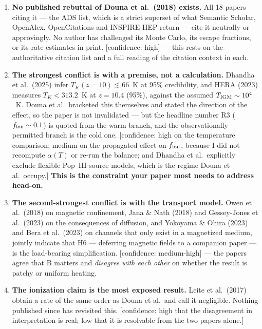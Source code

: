\documentclass[11pt,a4paper]{article}
\newcommand{\flag}[1]{\textcolor{orange!75!black}{\textsf{\small [#1]}}}
\begin{document}
\begin{enumerate}[leftmargin=*,itemsep=4pt]
\item \textbf{No published rebuttal of Douna et al.\ (2018) exists.}
      All 18 papers citing it --- the ADS list, which is a strict superset of
      what Semantic Scholar, OpenAlex, OpenCitations and INSPIRE-HEP return ---
      cite it neutrally or approvingly. No author has challenged its Monte
      Carlo, its escape fractions, or its rate estimates in print.
      \flag{confidence: high} --- this rests on the authoritative citation list
      and a full reading of the citation context in each.

\item \textbf{The strongest conflict is with a premise, not a calculation.}
      Dhandha et al.\ (2025) infer $T_K(z=10)\lesssim66$~K at 95\% credibility,
      and HERA (2023) measures $T_K < 313.2$~K at $z=10.4$ (95\%), against the
      assumed $T_{\rm IGM}\sim10^{4}$~K. Douna et al.\ bracketed this themselves
      and stated the direction of the effect, so the paper is not invalidated
      --- but the headline number R3 ($f_{\rm ion}\sim0.1$) is quoted from the
      warm branch, and the observationally permitted branch is the cold one.
      \flag{confidence: high on the temperature comparison; medium on the
      propagated effect on $f_{\rm ion}$, because I did not recompute
      $\alpha(T)$ or re-run the balance; and Dhandha et al.\ explicitly exclude
      flexible Pop~III source models, which is the regime Douna et al.\ occupy.}
      \textbf{This is the constraint your paper most needs to address head-on.}

\item \textbf{The second-strongest conflict is with the transport model.}
      Owen et al.\ (2018) on magnetic confinement, Jana \& Nath (2018) and
      Gessey-Jones et al.\ (2023) on the consequences of diffusion, and
      Yokoyama \& Ohira (2023) and Bera et al.\ (2023) on channels that only
      exist in a magnetized medium, jointly indicate that H6 --- deferring
      magnetic fields to a companion paper --- is the load-bearing simplification.
      \flag{confidence: medium-high} --- the papers agree that B matters and
      \emph{disagree with each other} on whether the result is patchy or
      uniform heating.

\item \textbf{The ionization claim is the most exposed result.}
      Leite et al.\ (2017) obtain a rate of the same order as Douna et al.\ and
      call it negligible. Nothing published since has revisited this.
      \flag{confidence: high that the disagreement in interpretation is real;
      low that it is resolvable from the two papers alone.}


\end{enumerate}
\end{document}
